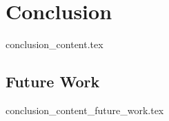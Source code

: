 \chapter{Conclusion}\label{sec:conclusion}
  {conclusion_content.tex}

\section{Future Work}
  {conclusion_content_future_work.tex}
